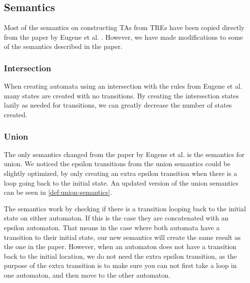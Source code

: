 \subsection{Semantics}\label{subsec:semantics}
\begin{comment}
    Where do most of our semantics come from?
    
    Intersection semantics
     - Motivation

    Describe union semantics
     - Motivation
     - New definition
     - Visual change
    
    Describe MatchAny semantics
     - Motivation
     - Definition
     - Visual
\end{comment}

Most of the semantics on constructing TAs from TREs have been copied directly from the paper by Eugene et al. \cite{Eugene2001}. However, we have made modifications to some of the semantics described in the paper.

\subsubsection{Intersection}
When creating automata using an intersection with the rules from Eugene et al.
many states are created with no transitions.
By creating the intersection states lazily as needed for transitions, we can greatly decrease the number of states created.

\subsubsection{Union}
The only semantics changed from the paper by Eugene et al. is the semantics for union.
We noticed the epsilon transitions from the union semantics could be slightly optimized, by only creating an extra epsilon transition when there is a loop going back to the initial state.
An updated version of the union semantics can be seen in \cref{def:union-semantics}.



The semantics work by checking if there is a transition looping back to the initial state on either automaton.
If this is the case they are concatenated with an epsilon automaton.
That means in the case where both automata have a transition to their initial state, our new semantics will create the same result as the one in the paper.
However, when an automaton does not have a transition back to the initial location, we do not need the extra epsilon transition, as the purpose of the extra transition is to make sure you can not first take a loop in one automaton, and then move to the other automaton.

